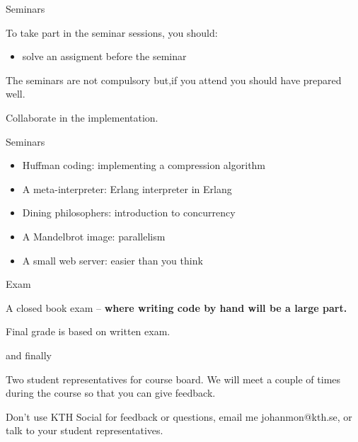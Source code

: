 \begin{frame}{Seminars}

  To take part in the seminar sessions, you should:
  \begin{itemize}
  \item solve an assigment before the seminar
  \end{itemize}

  \pause \vspace{20pt}
  The seminars are not compulsory but,\pause if you attend you should have prepared well. 

  \pause \vspace{20pt}
  Collaborate in the implementation.

\end{frame}

\begin{frame}{Seminars}
  \begin{itemize}
    \item Huffman coding: implementing a compression algorithm \pause
    \item A meta-interpreter: Erlang interpreter in Erlang \pause
    \item Dining philosophers: introduction to concurrency \pause
    \item A Mandelbrot image: parallelism \pause
    \item A small web server: easier than you think
  \end{itemize}
\end{frame}

\begin{frame}{Exam}

\pause A closed book exam -- {\bf where writing code by hand will be a large part.}

\vspace{20pt}

\pause Final grade is based on written exam. 

\end{frame}

\begin{frame}{and finally}

  Two student representatives for course board. We will meet a couple
  of times during the course so that you can give feedback.

\pause\vspace{20pt}

Don't use KTH Social for feedback or questions, email me
johanmon@kth.se, or talk to your student representatives.

\end{frame}


